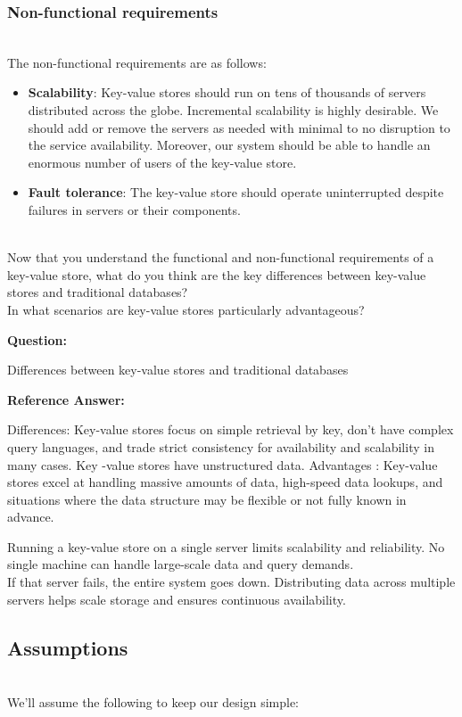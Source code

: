 \subsubsection{Non-functional requirements}\label{syLjws3-U6lL2Ggq7SfMG}
\\
The non-functional requirements are as follows:

\begin{itemize}
\item
\protect{}\label{C7pTNDPql04l_7HeBw6l9}
\textbf{Scalability}: Key-value stores should run on tens of thousands of servers distributed across the globe. Incremental scalability is highly desirable. We should add or remove the servers as needed with minimal to no disruption to the service availability. Moreover, our system should be able to handle an enormous number of users of the key-value store.
\item
\protect{}\label{J6cNFbQ09znjW-WWFGeXk}
\textbf{Fault tolerance}: The key-value store should operate uninterrupted despite failures in servers or their components.
\end{itemize}
\\
Now that you understand the functional and non-functional requirements of a key-value store, what do you think are the key differences between key-value stores and traditional databases?
\\
In what scenarios are key-value stores particularly advantageous?

\textbf{Question:}

Differences between key-value stores and traditional databases

\textbf{Reference Answer:}

Differences: Key-value stores focus on simple retrieval by key, don't have complex query languages, and trade strict consistency for availability and scalability in many cases. Key -value stores have unstructured data. Advantages
: Key-value stores excel at handling massive amounts of data, high-speed data lookups, and situations where the data structure may be flexible or not fully known in advance.

Running a key-value store on a single server limits scalability and reliability. No single machine can handle large-scale data and query demands.
\\
If that server fails, the entire system goes down. Distributing data across multiple servers helps scale storage and ensures continuous availability.

\subsection{Assumptions}\label{h5RCxPoNnAWysIfoPtcOL}
\\
We'll assume the following to keep our design simple:

